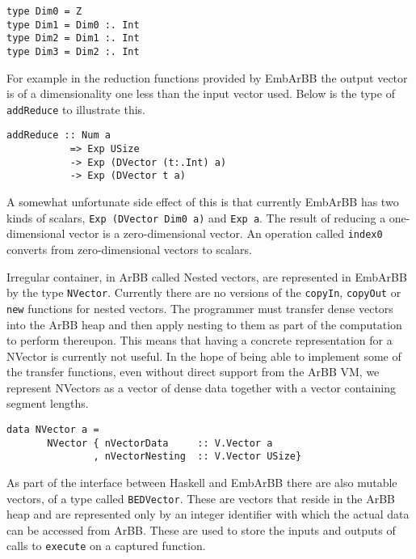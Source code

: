 
\begin{verbatim} 
type Dim0 = Z             
type Dim1 = Dim0 :. Int
type Dim2 = Dim1 :. Int 
type Dim3 = Dim2 :. Int
\end{verbatim} 

For example in the reduction functions provided by EmbArBB the 
output vector is of a dimensionality one less than the input vector 
used. Below is the type of {\tt addReduce} to illustrate this. 

\begin{verbatim} 
addReduce :: Num a 
           => Exp USize 
           -> Exp (DVector (t:.Int) a) 
           -> Exp (DVector t a)
\end{verbatim} 

A somewhat unfortunate side effect of this is that currently 
EmbArBB has two kinds of scalars,
{\tt Exp (DVector Dim0 a)} and {\tt Exp a}. The result of reducing 
a one-dimensional vector is a zero-dimensional vector. An operation 
called {\tt index0} converts from zero-dimensional vectors 
to scalars. 

Irregular container, in ArBB called Nested vectors, are represented in 
EmbArBB by the type {\tt NVector}. Currently there are no versions of the 
{\tt copyIn}, {\tt copyOut} or {\tt new} functions for nested vectors. 
The programmer must transfer dense vectors into the ArBB heap and then 
apply nesting to them as part of the computation to perform thereupon. This 
means that having a concrete representation for a NVector is currently 
not useful. In the hope of being able to implement some of the transfer 
functions, even without direct support from the ArBB VM, we represent 
NVectors as a vector of dense data together with a vector containing 
segment lengths.  

\begin{verbatim} 
data NVector a = 
       NVector { nVectorData     :: V.Vector a
               , nVectorNesting  :: V.Vector USize}
\end{verbatim} 

As part of the interface between Haskell and EmbArBB there are also mutable 
vectors, of a type called {\tt BEDVector}. These are vectors that reside in 
the ArBB heap and are represented only by an integer identifier with which 
the actual data can be accessed from ArBB. These are used to store the inputs 
and outputs of calls to {\tt execute} on a captured function. 
 

